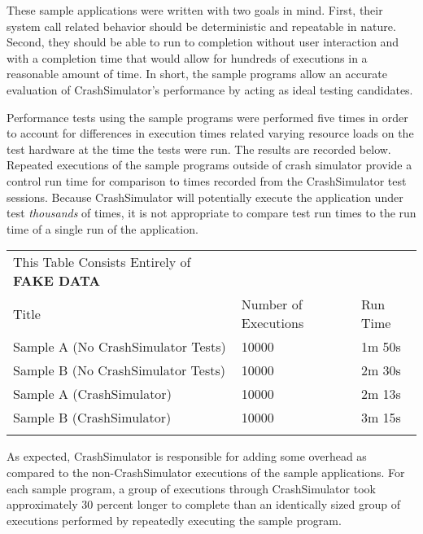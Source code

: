             These sample applications were written with two goals in mind. First, their system call related behavior
            should be deterministic and repeatable in nature. Second, they should be able to run to completion without
            user interaction and with a completion time that would allow for hundreds of executions in a reasonable
            amount of time. In short, the sample programs allow an accurate evaluation of CrashSimulator's performance
            by acting as ideal testing candidates.

            Performance tests using the sample programs were performed five times in order to account for differences in
            execution times related varying resource loads on the test hardware at the time the tests were run. The
            results are recorded below. Repeated executions of the sample programs outside of crash simulator provide a
            control run time for comparison to times recorded from the CrashSimulator test sessions. Because
            CrashSimulator will potentially execute the application under test \emph{thousands} of times, it is not
            appropriate to compare test run times to the run time of a single run of the application.

            \begin{table}[H]
                \scriptsize{}
                \begin{tabular} {l  l  l}
                    \toprule{}
                    This Table Consists Entirely of \textbf{FAKE DATA} \\
                    Title & Number of Executions & Run Time \\
                    Sample A (No CrashSimulator Tests) & 10000 & 1m 50s \\
                    Sample B (No CrashSimulator Tests) & 10000 & 2m 30s \\
                    Sample A (CrashSimulator) & 10000 & 2m 13s \\
                    Sample B (CrashSimulator) & 10000 & 3m 15s \\
                    \bottomrule{}
                \end{tabular}
            \end{table}

            As expected, CrashSimulator is responsible for adding some overhead as compared to the non-CrashSimulator
            executions of the sample applications. For each sample program, a group of executions through CrashSimulator
            took approximately 30 percent longer to complete than an identically sized group of executions performed by
            repeatedly executing the sample program.

